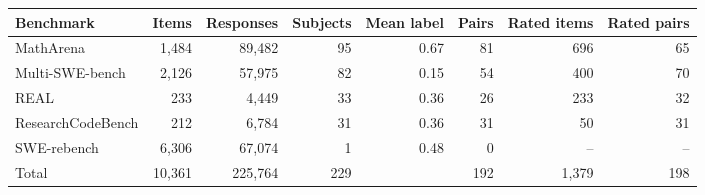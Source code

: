 \begin{tabular}{lrrrrrrr}
\toprule
Benchmark & Items & Responses & Subjects & Mean label & Pairs & Rated items & Rated pairs \\
\midrule
MathArena & 1,484 & 89,482 & 95 & 0.67 & 81 & 696 & 65 \\
Multi-SWE-bench & 2,126 & 57,975 & 82 & 0.15 & 54 & 400 & 70 \\
REAL & 233 & 4,449 & 33 & 0.36 & 26 & 233 & 32 \\
ResearchCodeBench & 212 & 6,784 & 31 & 0.36 & 31 & 50 & 31 \\
SWE-rebench & 6,306 & 67,074 & 1 & 0.48 & 0 & -- & -- \\
\midrule
Total & 10,361 & 225,764 & 229 & & 192 & 1,379 & 198 \\
\bottomrule
\end{tabular}
